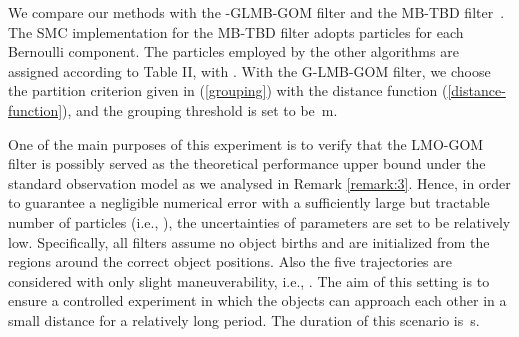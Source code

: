 \documentclass[journal]{IEEEtran}
\begin{document}
{We compare our methods with  the -GLMB-GOM filter and the  MB-TBD filter~\cite{refr:MeMber_filter}. The SMC implementation for the MB-TBD filter adopts  particles for each Bernoulli component.   The particles employed by 
the other algorithms are assigned according to Table II, with  .  With the  G-LMB-GOM filter, we choose the partition criterion given in  (\ref{grouping}) with the distance function  (\ref{distance-function}), and the grouping threshold is set to be \,m.

 One of the main purposes of this experiment is  to verify that the LMO-GOM filter is possibly served as the theoretical performance upper bound under the standard observation model as we analysed in Remark \ref{remark:3}. Hence, in order to  guarantee a negligible numerical error with a sufficiently large but tractable number of particles  (i.e., ), the uncertainties of parameters are set to be relatively low. Specifically, all filters assume no object births and are initialized from the regions around  the correct object positions. Also the five trajectories are considered with only slight maneuverability, i.e., .  
The aim of this setting is to ensure a controlled experiment in which the objects can approach each other in a small distance for a relatively long period.  The duration of this scenario is  \,s.

}
\end{document}
